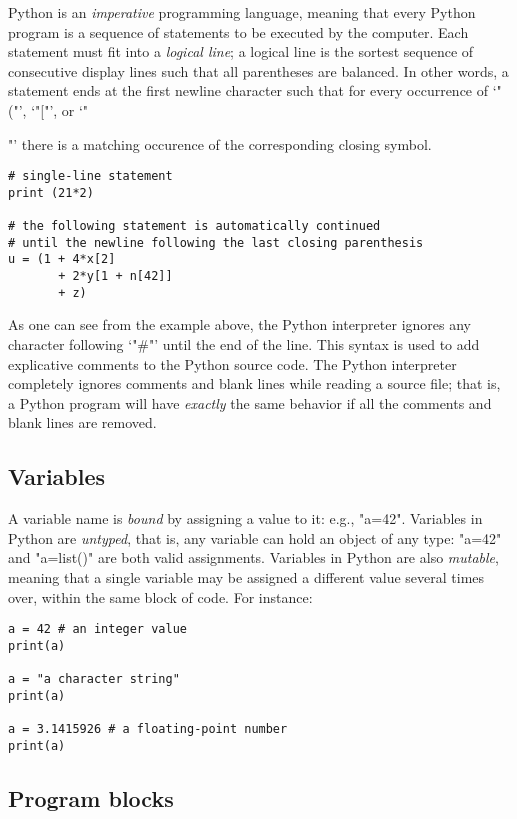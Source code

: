 Python is an \emph{imperative} programming language, meaning that
every Python program is a sequence of statements to be executed by the
computer.  Each statement must fit into a \emph{logical line}; a
logical line is the sortest sequence of consecutive display lines such
that all parentheses are balanced.  In other words, a statement ends
at the first newline character such that for every occurrence of
`"("', `"["', or `"{"' there is a matching occurence of
  the corresponding closing symbol.
\begin{lstlisting}
# single-line statement
print (21*2)

# the following statement is automatically continued
# until the newline following the last closing parenthesis
u = (1 + 4*x[2] 
       + 2*y[1 + n[42]]
       + z)
\end{lstlisting}
As one can see from the example above, the Python interpreter ignores
any character following `"#"' until the end of the line.  This
syntax is used to add explicative comments to the Python source code.
The Python interpreter completely ignores comments and blank lines
while reading a source file; that is, a Python program will have
\emph{exactly} the same behavior if all the comments and blank lines
are removed.

\subsection{Variables}
\label{sec:variables}

A variable name is \emph{bound} by assigning a value to it: e.g.,
"a=42".  Variables in Python are \emph{untyped}, that is, any
variable can hold an object of any type: "a=42" and "a=list()"
are both valid assignments. Variables in Python are also
\emph{mutable}, meaning that a single variable may be assigned a
different value several times over, within the same block of code.
For instance:
\begin{lstlisting}
a = 42 # an integer value
print(a)

a = "a character string"
print(a)

a = 3.1415926 # a floating-point number
print(a)
\end{lstlisting}


\subsection{Program blocks}
\label{sec:blocks}

}
